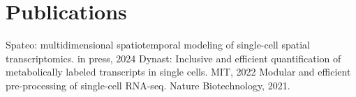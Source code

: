 \documentclass[]{resume}
\begin{document}
\begin{minipage}[t]{0.28\textwidth}

\section{Publications}
\renewcommand\refname{\vskip -1.5em} %
\begin{thebibliography}{9}
Spateo: multidimensional spatiotemporal modeling of single-cell spatial transcriptomics. in press, 2024
Dynast: Inclusive and efficient quantification of metabolically labeled transcripts in single cells. MIT, 2022
Modular and efficient pre-processing of single-cell RNA-seq. Nature Biotechnology, 2021.
\end{thebibliography}


%
%

\end{minipage}
\hfill
\end{document}
